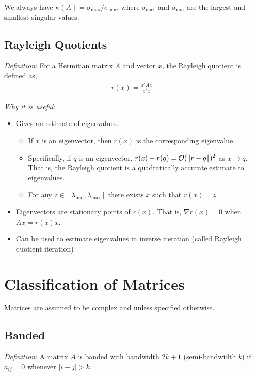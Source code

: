 \documentclass[12pt]{article}
\begin{document}
We always have \( \kappa(A) = \sigma_{\text{max}}/\sigma_{\text{min}} \), where \( \sigma_\text{max} \) and \( \sigma_\text{min} \) are the largest and smallest singular values.


\subsection{Rayleigh Quotients}
\textit{Definition}: For a Hermitian matrix \( A \) and vector \( x \), the Rayleigh quotient is defined as,
\begin{align*}
    r(x) = \frac{x^*Ax}{x^*x}
\end{align*}

\textit{Why it is useful}:
\begin{itemize}[nolistsep]
    \item Gives an estimate of eigenvalues.
        \begin{itemize}[nolistsep]
            \item If \( x \) is an eigenvector, then \( r(x) \) is the corresponding eigenvalue.
            \item Specifically, if \( q \) is an eigenvector, \( r(x) - r(q) = \mathcal{O}(\left\lVert r-q\right\rVert)^2 \) as \( x\to q \). That is, the Rayleigh quotient is a quadratically accurate estimate to eigenvalues.
            \item For any \( z\in[\lambda_{\text{min}},\lambda_{\text{max}}] \) there exists \( x \) such that \( r(x) = z \).
        \end{itemize}
    \item Eigenvectors are stationary points of \( r(x) \). That is, \( \nabla r(x) = 0 \) when \( Ax = r(x) x \).
    \item Can be used to estimate eigenvalues in inverse iteration (called Rayleigh quotient iteration)
\end{itemize}





\pagebreak
\section{Classification of Matrices}
Matrices are assumed to be complex and unless specified otherwise.

\subsection{Banded}
\textit{Definition}: A matrix \( A \) is banded with bandwidth \( 2k+1 \) (semi-bandwidth \( k \)) if \( a_{ij} = 0 \) whenever \( |i-j| > k \).
\end{document}
